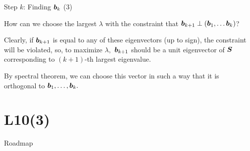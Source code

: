 \documentclass[handout,fleqn,aspectratio=169]{beamer}
\begin{document}
\begin{frame}{Step $k$: Finding $\bm{b}_k$ (3)}

\small
\plitemsep 0.1in
\bci 

\item \question How can we choose the largest $\lambda$ with the constraint that $\bm{b}_{k+1} \perp (\bm{b}_1, \ldots \bm{b}_k)$? 


\item Clearly, if $\bm{b}_{k+1}$ is equal to any of these eigenvectors (up to sign), the constraint will be violated, so, to maximize $\lambda,$ $\bm{b}_{k+1}$ should be a unit eigenvector of $\bm{S}$ corresponding to $(k+1)$-th largest eigenvalue. 

\item By spectral theorem, we can choose this vector in such a way that it is orthogonal to $\bm{b}_1, \ldots, \bm{b}_k.$ \hfill {}
\eci
\end{frame}


\section{L10(3)}
\begin{frame}{Roadmap}

\plitemsep 0.1in

\bce[(1)] 

\item {} 
\item {} 
\item {}

\ece
\end{frame}
\end{document}
